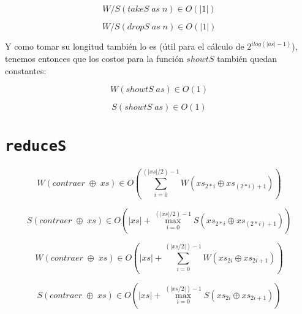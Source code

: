 \documentclass[a4paper,10pt]{article}
\begin{document}
\begin{equation*}
    W/S \left( takeS\; as\; n \right) \in 
    O \left( \vert 1 \vert \right)
\end{equation*}

\begin{equation*}
    W/S \left( dropS\; as\; n \right) \in 
    O \left( \vert 1 \vert \right)
\end{equation*}

\smallskip
   
    Y como tomar su longitud también lo es (útil para el cálculo de 
$2^{ilog(\vert as \vert -1)}$), tenemos entonces que los costos para la función
$showtS$ también quedan constantes:

\begin{equation*}
    W \left( showtS\; as \right) \in O \left( 1 \right)
\end{equation*}

\begin{equation*}
    S \left( showtS\; as \right) \in O \left( 1 \right)
\end{equation*}


\bigskip
    

\section*{\texttt{reduceS}}

\begin{equation*}
    W \left( contraer\; \oplus \;xs \right) \in
    O \left( \sum_{i=0}^{(\vert xs \vert /2 )-1} W \left( xs_{2*i} \oplus xs_{(2*i) +1} \right) \right)
\end{equation*}

\begin{equation*}
    S \left( contraer\; \oplus \;xs \right) \in
    O \left( \vert xs \vert + \max_{i=0}^{(\vert xs \vert /2 )-1} S \left( xs_{2*i} \oplus xs_{(2*i) +1} \right) \right)
\end{equation*}

\smallskip

\begin{equation*}
    W \left( contraer \;\oplus \;xs \right) \in
    O \left( \vert xs \vert + \sum_{i=0}^{(\vert xs / 2 \vert) - 1} W \left( xs_{2i} \oplus xs_{2i+1} \right) \right)
\end{equation*}

\begin{equation*}
    S \left( contraer \;\oplus \;xs \right) \in
    O \left( \vert xs \vert + \max_{i=0}^{(\vert xs / 2 \vert) - 1} S \left( xs_{2i} \oplus xs_{2i+1} \right) \right)
\end{equation*}
\end{document}
